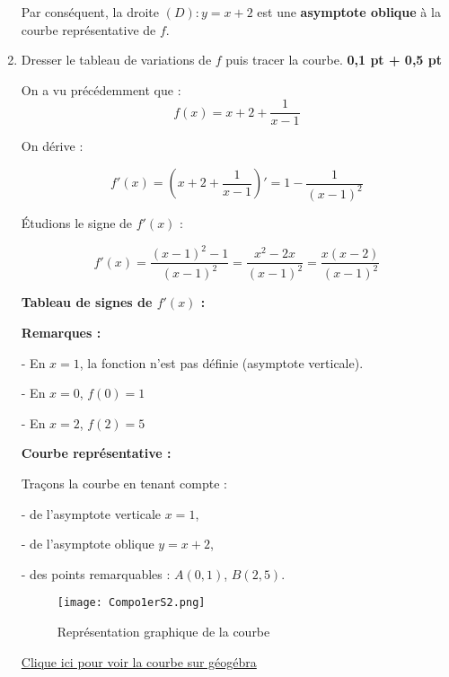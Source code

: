 \documentclass[12pt,a4paper]{article}
\begin{document}
\begin{enumerate}
Par conséquent, la droite \( (D) : y = x + 2 \) est une \textbf{asymptote oblique} à la courbe représentative de \( f \).

    

\item Dresser le tableau de variations de \( f \) puis tracer la courbe. \hfill \textbf{0{,}1 pt + 0{,}5 pt}

On a vu précédemment que :
\[
f(x) = x + 2 + \frac{1}{x - 1}
\]

On dérive :

\[
f'(x) = \left(x + 2 + \frac{1}{x - 1}\right)' = 1 - \frac{1}{(x - 1)^2}
\]

Étudions le signe de \( f'(x) \) :

\[
f'(x) = \frac{(x - 1)^2 - 1}{(x - 1)^2} = \frac{x^2 - 2x}{(x - 1)^2} = \frac{x(x - 2)}{(x - 1)^2}
\]

\textbf{Tableau de signes de \( f'(x) \) :}

\begin{center}
\end{center}

\textbf{Remarques :}

- En \( x = 1 \), la fonction n'est pas définie (asymptote verticale).

- En \( x = 0 \), \( f(0) = 1 \)

- En \( x = 2 \), \( f(2) = 5 \)

\medskip

\textbf{Courbe représentative :}

Traçons la courbe en tenant compte :

- de l’asymptote verticale \( x = 1 \),

- de l’asymptote oblique \( y = x + 2 \),

- des points remarquables : \( A(0,1) \), \( B(2,5) \).

\begin{center}
\begin{figure}[H]%
\centering
\texttt{[image: Compo1erS2.png]}
\caption{Représentation graphique de la courbe}
\label{fig:monimage}
\end{figure}
\href{https://www.geogebra.org/classic/rduxvtyf}{Clique ici pour voir la courbe sur géogébra}\\
\end{center}

\end{enumerate}
\end{document}
